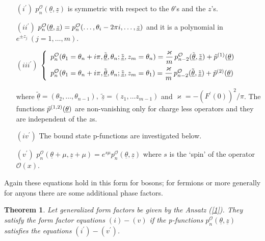 \documentclass[a4paper,12pt]{article}
\newtheorem{theorem}{Theorem}{}
\begin{document}
\begin{itemize}
\item[$(i^{\prime })$]  $p_{n}^{\mathcal{O}}(\underline{\theta },\underline{z%
})$ is symmetric with respect to the $\theta $'s and the $z$'s.

\item[$(ii^{\prime })$]  $p_{n}^{\mathcal{O}}(\underline{\theta },\underline{%
z})=p_{n}^{\mathcal{O}}(\dots ,\theta _{i}-2\pi i,\dots ,\underline{z})$ and
it is a polynomial in $e^{\pm z_{j}}~(j=1,\dots ,m)$.

\item[$(iii^{\prime })$]  $\left\{ 
\begin{array}{l}
p_{n}^{\mathcal{O}}(\theta _{1}=\theta _{n}+i\pi ,\tilde{\underline{\theta }}%
,\theta _{n};\tilde{\underline{z}},z_{m}=\theta _{n}{)}=\dfrac{\varkappa }{m}%
\,p_{n-2}^{\mathcal{O}}(\tilde{\underline{\theta }},\tilde{\underline{z}})+%
\tilde{p}^{(1)}({\underline{\theta }})\vspace{5pt} \\ 
p_{n}^{\mathcal{O}}(\theta _{1}=\theta _{n}+i\pi ,\tilde{\underline{\theta }}%
,\theta _{n};\tilde{\underline{z}},z_{m}=\theta _{1}{)}=\dfrac{\varkappa }{m}%
\,p_{n-2}^{\mathcal{O}}(\tilde{\underline{\theta }},\tilde{\underline{z}})+%
\tilde{p}^{(2)}({\underline{\theta }})
\end{array}
\right. $

where $\tilde{\underline{\theta }}=(\theta _{2},\dots ,\theta _{n-1}),\;%
\tilde{\underline{z}}=(z_{1},\dots z_{m-1})$ and \cite{BFKZ} $\varkappa
=-\left( F^{\prime }(0)\right) ^{2}/\pi $. The functions $\tilde{p}^{(1,2)}({%
\underline{\theta }})$ are non-vanishing only for charge less operators and
they are independent of the $z$s.

\item[$(iv^{\prime })$]  The bound state p-functions are investigated below.

\item[$(v^{\prime })$]  $p_{n}^{\mathcal{O}}(\underline{\theta }+\mu ,%
\underline{z}+\mu )=e^{s\mu }p_{n}^{\mathcal{O}}(\underline{\theta },%
\underline{z})$ where $s$ is the `spin' of the operator $\mathcal{O}(x)$.
\end{itemize}

Again these equations hold in this form for bosons; for fermions or more
generally for anyons there are some additional phase factors.

\begin{theorem}
Let generalized form factors be given by the Ansatz (\ref{1}). They satisfy
the form factor equations $(i)-(v)$ if the p-functions $p_{n}^{\mathcal{O}}(%
\underline{\theta },\underline{z})$ satisfies the equations $(i^{\prime
})-(v^{\prime })$.
\end{theorem}
\end{document}

